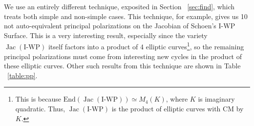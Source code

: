 \documentclass[12pt,reqno]{amsart}
\DeclareMathOperator{\Jac}{Jac}
\newtheorem*{thm*}{Theorem}
\theoremstyle{definition}
\theoremstyle{remark}
\newcommand{\ti}{\todo[inline]}
\begin{document}


We use an entirely different technique, exposited in Section ~\ref{sec:find}, which treats both simple and non-simple cases. This technique, for example, gives us 10 not auto-equivalent principal polarizations on the Jacobian of Schoen's I-WP Surface. This is a very interesting result, especially since the variety $\Jac(\text{I-WP})$ itself factors into a product of 4 elliptic curves\footnote{This is because $\text{End}(\Jac(\text{I-WP})) \simeq M_4(K)$, where $K$ is imaginary quadratic. Thus, $\Jac(\text{I-WP})$ is the product of elliptic curves with CM by $K$.}, so the remaining principal polarizations must come from interesting new cycles in the product of these elliptic curves. Other such results from this technique are shown in Table ~\ref{table:pp}.
\end{document}
